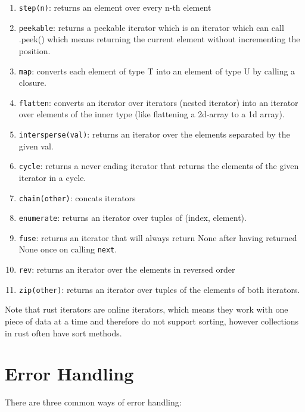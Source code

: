 \begin{enumerate}
    \item \lstinline{step(n)}: returns an element over every n-th element
    \item \lstinline{peekable}: returns a peekable iterator which is an iterator which can call .peek() which means returning the current element without incrementing the position.
    \item \lstinline{map}: converts each element of type T into an element of type U by calling a closure.
    \item \lstinline{flatten}: converts an iterator over iterators (nested iterator) into an iterator over elements of the inner type (like flattening a 2d-array to a 1d array).
    \item \lstinline{intersperse(val)}: returns an iterator over the elements separated by the given val.
    \item \lstinline{cycle}: returns a never ending iterator that returns the elements of the given iterator in a cycle.
    \item \lstinline{chain(other)}: concats iterators
    \item \lstinline{enumerate}: returns an iterator over tuples of (index, element).
    \item \lstinline{fuse}: returns an iterator that will always return None after having returned None once on calling \lstinline{next}.
    \item \lstinline{rev}: returns an iterator over the elements in reversed order
    \item \lstinline{zip(other)}: returns an iterator over tuples of the elements of both iterators.
\end{enumerate}

Note that rust iterators are online iterators, which means they work with one piece of data at a time and therefore do not support sorting, however collections in rust often have sort methods.

\section{Error Handling}

There are three common ways of error handling:

